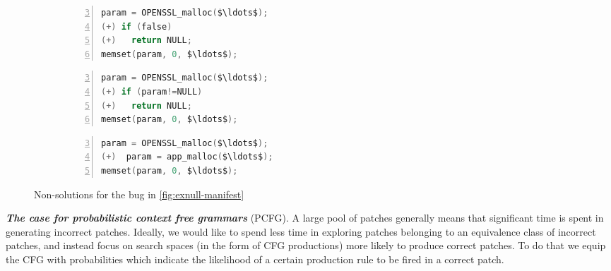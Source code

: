 \begin{figure*}[t]
\centering
{\footnotesize
\begin{subfigure}{0.31\textwidth}
\begin{lstlisting}[language=C,mathescape=true,firstnumber=3,numbers=left]
param = OPENSSL_malloc($\ldots$);
(+) if (false) 
(+)   return NULL; 
memset(param, 0, $\ldots$);
\end{lstlisting}
\vspace{-1em}
\caption{}\label{fig:nonsol1}
\end{subfigure}
\begin{subfigure}{0.31\textwidth}
\begin{lstlisting}[language=C,mathescape=true,firstnumber=3,numbers=left]
param = OPENSSL_malloc($\ldots$);
(+) if (param!=NULL) 
(+)   return NULL; 
memset(param, 0, $\ldots$);
\end{lstlisting}
\vspace{-1em}
\caption{}\label{fig:nonsol2}
\end{subfigure}
\begin{subfigure}{0.31\textwidth}\begin{lstlisting}[language=C,mathescape=true,firstnumber=3,numbers=left]
param = OPENSSL_malloc($\ldots$);
(+)  param = app_malloc($\ldots$);
memset(param, 0, $\ldots$);
\end{lstlisting}
\vspace{-1em}
\caption{}\label{fig:nonsol4}
\end{subfigure}
}
\vspace{-1em}
\caption{Non-solutions for the bug in \autoref{fig:exnull-manifest}}\label{fig:nonsol}
\vspace{-1em}
\end{figure*}

\noindent \emph{\bf The case for probabilistic context free grammars} (PCFG). 
A large pool of patches generally means that significant time is spent
in generating incorrect patches. Ideally, we would like to spend less time in exploring patches belonging to an equivalence class of incorrect patches, and instead focus on search spaces (in the form of CFG productions) more likely to produce correct patches. 
To do that we equip the CFG with probabilities which indicate the likelihood of a certain 
production rule to be fired in a correct patch. 

